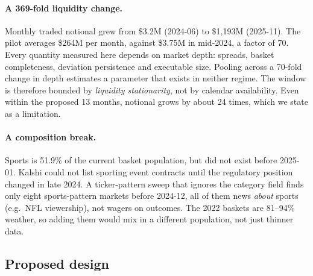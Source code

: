 \documentclass[11pt,a4paper]{article}
\begin{document}
\paragraph{A 369-fold liquidity change.} Monthly traded notional grew from
\$3.2M (2024-06) to \$1{,}193M (2025-11). The pilot averages \$264M per month,
against \$3.75M in mid-2024, a factor of 70. Every quantity measured here depends
on market depth: spreads, basket completeness, deviation persistence and
executable size. Pooling across a 70-fold change in depth estimates a parameter
that exists in neither regime. The window is therefore bounded by
\emph{liquidity stationarity}, not by calendar availability. Even within the
proposed 13 months, notional grows by about 24 times, which we state as a
limitation.

\paragraph{A composition break.} Sports is 51.9\% of the current basket
population, but did not exist before 2025-01. Kalshi could not list sporting
event contracts until the regulatory position changed in late 2024. A
ticker-pattern sweep that ignores the category field finds only eight
sports-pattern markets before 2024-12, all of them news \emph{about} sports
(e.g.\ NFL viewership), not wagers on outcomes. The 2022 baskets are 81--94\%
weather, so adding them would mix in a different population, not just thinner
data.

\subsection{Proposed design}
\end{document}
